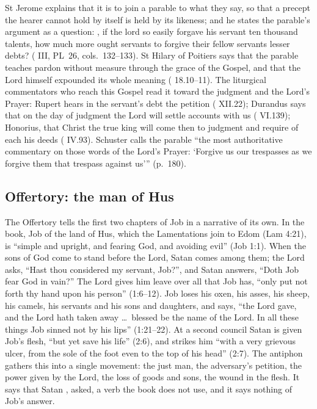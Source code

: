 St Jerome explains that it is  to join a parable to what they say, so that a precept the hearer
cannot hold by itself is held by its likeness; and he states the parable's
argument as a question: , if the lord so easily forgave his servant ten thousand talents, how
much more ought servants to forgive their fellow servants lesser debts?
( III, PL~26, cols.~132--133). St Hilary of
Poitiers says that the parable teaches pardon without measure through the grace
of the Gospel, and that the Lord himself expounded its whole meaning
( 18.10--11). The liturgical commentators who
reach this Gospel read it toward the judgment and the Lord's Prayer: Rupert hears
in the servant's debt the petition 
( XII.22); Durandus says that on the day of judgment the
Lord will settle accounts with us ( VI.139); Honorius, that
Christ the true king will come then to judgment and require of each his deeds
( IV.93). Schuster calls the parable ``the most authoritative
commentary on those words of the Lord's Prayer: `Forgive us our trespasses as we
forgive them that trespass against us''' (p.~180).

\subsection{Offertory: the man of Hus}

The Offertory tells the first two chapters of Job in a narrative of its own. In
the book, Job of the land of Hus, which the Lamentations join to Edom (Lam
4:21), is ``simple and upright, and fearing God, and avoiding evil'' (Job 1:1).
When the sons of God come to stand before the Lord, Satan comes among them; the
Lord asks, ``Hast thou considered my servant, Job?'', and Satan answers, ``Doth
Job fear God in vain?'' The Lord gives him leave over all that Job has, ``only
put not forth thy hand upon his person'' (1:6--12). Job loses his oxen, his
asses, his sheep, his camels, his servants and his sons and daughters, and says,
``the Lord gave, and the Lord hath taken away \dots\ blessed be the name of the
Lord. In all these things Job sinned not by his lips'' (1:21--22). At a second
council Satan is given Job's flesh, ``but yet save his life'' (2:6), and strikes
him ``with a very grievous ulcer, from the sole of the foot even to the top of
his head'' (2:7). The antiphon gathers this into a single movement: the just man,
the adversary's petition, the power given by the Lord, the loss of goods and
sons, the wound in the flesh. It says that Satan , asked, a verb
the book does not use, and it says nothing of Job's answer.

